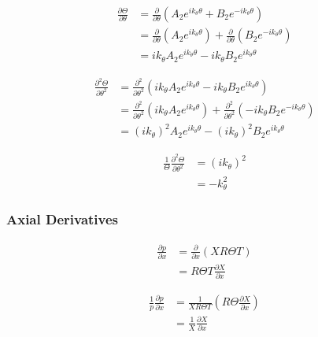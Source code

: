 \begin{align*}
    \frac{\partial \Theta}{\partial \theta} &=
    \frac{\partial}{\partial \theta}
        \left( 
            A_2 e^{i k_{\theta} \theta} + B_2 e^{-i k_{\theta} \theta}
        \right)  \\
    &=
    \frac{\partial}{\partial \theta} \left(A_2 e^{i k_{\theta} \theta}  \right) +
    \frac{\partial}{\partial \theta} \left(B_2 e^{-i k_{\theta} \theta}  \right)\\ 
    &= i k_{\theta} A_2 e^{i k_{\theta} \theta} - i k_{\theta} B_2 e^{i k_{\theta} \theta} 
\end{align*}

\begin{align*}
    \frac{\partial^2 \Theta }{\partial \theta^2} &=
    \frac{\partial^2}{\partial \theta^2}
        \left( 
        i k_{\theta} A_2 e^{i k_{\theta} \theta} - i k_{\theta} B_2 e^{i k_{\theta} \theta} 
    \right)  \\
    &=
    \frac{\partial^2}{\partial \theta^2} \left(i k_{\theta} A_2 e^{i k_{\theta} \theta}  \right) +
    \frac{\partial^2}{\partial \theta^2} \left(- i k_{\theta} B_2 e^{-i k_{\theta} \theta}  \right)\\ 
    &= (i k_{\theta})^2 A_2 e^{i k_{\theta} \theta } - (i k_{\theta})^2 B_2 e^{i k_{\theta} \theta} 
\end{align*}

\begin{align*}
    \frac{1}{\Theta}\frac{\partial^2 \Theta}{\partial \theta^2} 
    &=
    (ik_{\theta})^2 \\
    &= -k_{\theta}^2
\end{align*}

\subsubsection{Axial Derivatives}

\begin{align*}
    \frac{\partial p}{\partial x} 
    &=
    \frac{\partial }{\partial x}  \left( XR\Theta T \right) \\
    &=
    R\Theta T \frac{\partial X}{\partial x}  
\end{align*}


\begin{align*}
    \frac{1}{p}\frac{\partial p}{\partial x} 
    &=
    \frac{ 1}{X R \Theta T}  \left( R\Theta\frac{\partial X}{\partial x} \right) \\
    &=\frac{ 1}{ X}\frac{\partial X}{\partial x}  
\end{align*}

